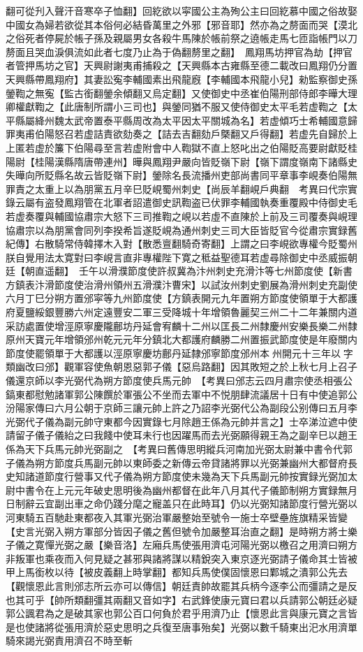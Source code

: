 翻可從刋入聲汗音寒卒子恤翻】回紇欲以寜國公主為殉公主曰回紇慕中國之俗故娶中國女為婦若欲從其本俗何必結昏萬里之外邪【邪音耶】然亦為之剺面而哭【漠北之俗死者停屍於帳子孫及親屬男女各殺牛馬陳於帳前祭之遶帳走馬七匝詣帳門以刀剺面且哭血淚俱流如此者七度乃止為于偽翻剺里之翻】　鳳翔馬坊押官為劫【押官者管押馬坊之官】天興尉謝夷甫捕殺之【天興縣本古雍縣至德二載改曰鳳翔仍分置天興縣帶鳳翔府】其妻訟寃李輔國素出飛龍廐【李輔國本飛龍小兒】勑監察御史孫鎣鞫之無寃【監古銜翻鎣余傾翻又烏定翻】又使御史中丞崔伯陽刑部侍郎李曄大理卿權獻鞫之【此唐制所謂小三司也】與鎣同猶不服又使侍御史太平毛若虚鞫之【太平縣屬絳州魏太武帝置泰平縣周改為太平因太平關城為名】若虚傾巧士希輔國意歸罪夷甫伯陽怒召若虚詰責欲劾奏之【詰去吉翻劾戶槩翻又戶得翻】若虚先自歸於上上匿若虚於簾下伯陽尋至言若虚附會中人鞫獄不直上怒叱出之伯陽貶高要尉獻貶桂陽尉【桂陽漢縣隋唐帶連州】曄與鳳翔尹嚴向皆貶嶺下尉【嶺下謂度嶺南下諸縣史失曄向所貶縣名故云皆貶嶺下尉】鎣除名長流播州吏部尚書同平章事李峴奏伯陽無罪責之太重上以為朋黨五月辛巳貶峴蜀州刺史【尚辰羊翻峴戶典翻　考異曰代宗實錄云屬有盗發鳳翔管在北軍者詔遣御史訊鞫盗已伏罪李輔國執奏重覆殿中侍御史毛若虚奏覆與輔國協肅宗大怒下三司推鞫之峴以若虛不直陳於上前及三司覆奏與峴理協肅宗以為朋黨會同列李揆希旨遂貶峴為通州刺史三司大臣皆貶官今從肅宗實録舊紀傳】右散騎常侍韓擇木入對【散悉亶翻騎奇寄翻】上謂之曰李峴欲專權今貶蜀州朕自覺用法太寛對曰李峴言直非專權陛下寛之秪益聖德耳若虚尋除御史中丞威振朝廷【朝直遥翻】　壬午以滑濮節度使許叔冀為汴州刺史充滑汴等七州節度使【新書方鎮表汴滑節度使治滑州領州五滑濮汴曹宋】以試汝州刺史劉展為滑州刺史充副使　六月丁巳分朔方置邠寜等九州節度使【方鎮表開元九年置朔方節度使領單于大都護府夏鹽綏銀豐勝六州定遠豐安二軍三受降城十年增領魯麗契三州二十二年兼關内道采訪處置使增涇原寧慶隴鄜坊丹延會宥麟十二州以匡長二州隸慶州安樂長樂二州隸原州天寶元年增領邠州乾元元年分鎮北大都護府麟勝二州置振武節度使是年廢關内節度使罷領單于大都護以涇原寧慶坊鄜丹延隸邠寧節度邠州本州開元十三年以字類幽改曰邠】觀軍容使魚朝恩惡郭子儀【惡烏路翻】因其敗短之於上秋七月上召子儀還京師以李光弼代為朔方節度使兵馬元帥　【考異曰邠志云四月肅宗使丞相張公鎬東都慰勉諸軍郭公陳饌於軍張公不坐而去軍中不悦朋肆流議居十日有中使追郭公汾陽家傳曰六月公朝于京師三讓元帥上許之乃詔李光弼代公為副段公别傳曰五月李光弼代子儀為副元帥守東都今因實錄七月除趙王係為元帥并言之】士卒涕泣遮中使請留子儀子儀紿之曰我餞中使耳未行也因躍馬而去光弼願得親王為之副辛巳以趙王係為天下兵馬元帥光弼副之　【考異曰舊傳思明縱兵河南加光弼太尉兼中書令代郭子儀為朔方節度兵馬副元帥以東師委之新傳云帝貸諸將罪以光弼兼幽州大都督府長史知諸道節度行營事又代子儀為朔方節度使未幾為天下兵馬副元帥按實録光弼加太尉中書令在上元元年破史思明後為幽州都督在此年八月其代子儀節制朔方實録無月日制辭云宜副出車之命仍踐分麾之寵盖只在此時耳】仍以光弼知諸節度行營光弼以河東騎五百馳赴東都夜入其軍光弼治軍嚴整始至號令一施士卒壁壘旌旗精采皆變【史言光弼入朔方軍部分皆因子儀之舊但號令加嚴整耳治直之翻】是時朔方將士樂子儀之寛憚光弼之嚴【樂音洛】左廂兵馬使張用濟屯河陽光弼以檄召之用濟曰朔方非叛軍也乘夜而入何見疑之甚邪與諸將謀以精銳突入東京逐光弼請子儀命其士皆被甲上馬銜枚以待【被皮義翻上時掌翻】都知兵馬使僕固懷恩曰鄴城之潰郭公先去【觀懷恩此言則邠志所云亦可以傳信】朝廷責帥故罷其兵柄今逐李公而彊請之是反也其可乎【帥所類翻彊其兩翻又音如字】右武鋒使康元寶曰君以兵請郭公朝廷必疑郭公諷君為之是破其家也郭公百口何負於君乎用濟乃止【懷恩此言與康元寶之言皆是也使諸將從張用濟於惡史思明之兵復至唐事殆矣】光弼以數千騎東出汜水用濟單騎來謁光弼責用濟召不時至斬
